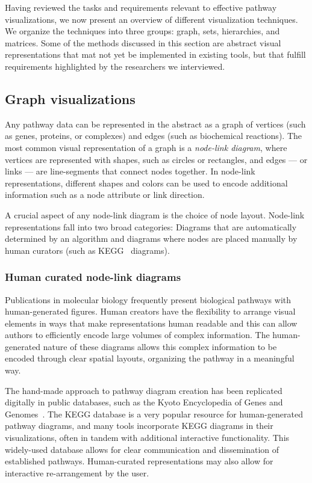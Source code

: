 \documentclass[review,journal]{vgtc}         %
\newcounter{task}
\newcounter{requirement}
\begin{document}
Having reviewed the tasks and requirements relevant to effective pathway visualizations, we now present an overview of different visualization techniques. We organize the techniques into three groups: graph, sets, hierarchies, and matrices. Some of the methods discussed in this section are abstract visual representations that mat not yet be implemented in existing tools, but that fulfill requirements highlighted by the researchers we interviewed.

\subsection{Graph visualizations}

Any pathway data can be represented in the abstract as a graph of vertices (such as genes, proteins, or complexes) and edges (such as biochemical reactions). The most common visual representation of a graph is a \emph{node-link diagram}, where vertices are represented with shapes, such as circles or rectangles, and edges --- or links --- are line-segments that connect nodes together. In node-link representations, different shapes and colors can be used to encode additional information such as a node attribute or link direction.

A crucial aspect of any node-link diagram is the choice of node layout. Node-link representations fall into two broad categories: Diagrams that are automatically determined by an algorithm and diagrams where nodes are placed manually by human curators (such as KEGG~\cite{kanehisa2000kegg} diagrams).

\subsubsection{Human curated node-link diagrams}

Publications in molecular biology frequently present biological pathways with human-generated figures. Human creators have the flexibility to arrange visual elements in ways that make representations human readable and this can allow authors to efficiently encode large volumes of complex information. The human-generated nature of these diagrams allows this complex information to be encoded through clear spatial layouts, organizing the pathway in a meaningful way.

The hand-made approach to pathway diagram creation has been replicated digitally in public databases, such as the Kyoto Encyclopedia of Genes and Genomes~\cite{kanehisa2000kegg}. The KEGG database is a very popular resource for human-generated pathway diagrams, and many tools incorporate KEGG diagrams in their visualizations, often in tandem with additional interactive functionality. This widely-used database allows for clear communication and dissemination of established pathways. Human-curated representations may also allow for interactive re-arrangement by the user.
\end{document}
